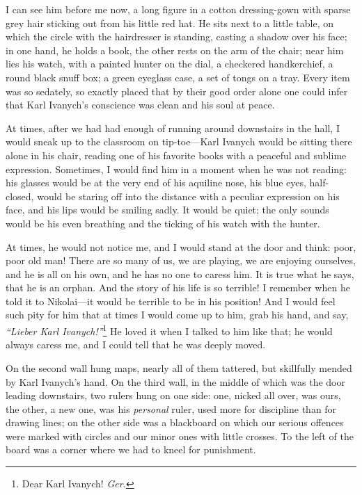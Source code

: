 I can see him before me now, a long figure in a cotton dressing-gown with sparse grey hair sticking out from his little red hat. He sits next to a little table, on which the circle with the hairdresser is standing, casting a shadow over his face; in one hand, he holds a book, the other rests on the arm of the chair; near him lies his watch, with a painted hunter on the dial, a checkered handkerchief, a round black snuff box; a green eyeglass case, a set of tongs on a tray. Every item was so sedately, so exactly placed that by their good order alone one could infer that Karl Ivanych's conscience was clean and his soul at peace.

At times, after we had had enough of running around downstairs in the hall, I would sneak up to the classroom on tip-toe---Karl Ivanych would be sitting there alone in his chair, reading one of his favorite books with a peaceful and sublime expression. Sometimes, I would find him in a moment when he was not reading: his glasses would be at the very end of his aquiline nose, his blue eyes, half-closed, would be staring off into the distance with a peculiar expression on his face, and his lips would be smiling sadly. It would be quiet; the only sounds would be his even breathing and the ticking of his watch with the hunter.

At times, he would not notice me, and I would stand at the door and think: poor, poor old man! There are so many of us, we are playing, we are enjoying ourselves, and he is all on his own, and he has no one to caress him. It is true what he says, that he is an orphan. And the story of his life is so terrible! I remember when he told it to Nikolai---it would be terrible to be in his position! And I would feel such pity for him that at times I would come up to him, grab his hand, and say, \textit{``Lieber Karl Ivanych!''}\footnote{Dear Karl Ivanych! \textit{Ger.}} He loved it when I talked to him like that; he would always caress me, and I could tell that he was deeply moved.

On the second wall hung maps, nearly all of them tattered, but skillfully mended by Karl Ivanych's hand. On the third wall, in the middle of which was the door leading downstairs, two rulers hung on one side: one, nicked all over, was ours, the other, a new one, was his \emph{personal} ruler, used more for discipline than for drawing lines; on the other side was a blackboard on which our serious offences were marked with circles and our minor ones with little crosses. To the left of the board was a corner where we had to kneel for punishment.

